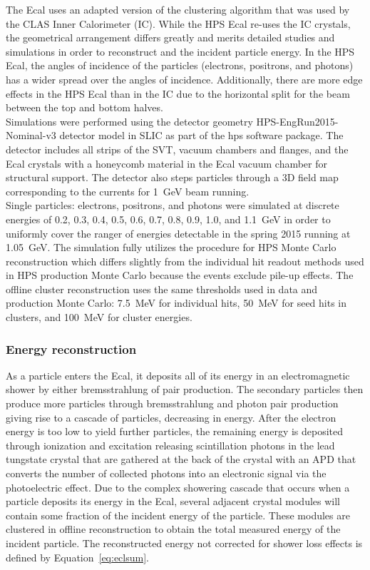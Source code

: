 The Ecal uses an adapted version of the clustering algorithm that was used by the CLAS Inner Calorimeter (IC). While the HPS Ecal re-uses the IC crystals, the geometrical arrangement differs greatly and merits detailed studies and simulations in order to reconstruct and the incident particle energy. In the HPS Ecal, the angles of incidence of the particles (electrons, positrons, and photons) has a wider spread over the angles of incidence. Additionally, there are more edge effects in the HPS Ecal than in the IC due to the horizontal split for the beam between the top and bottom halves. \\
\indent Simulations were performed using the detector geometry HPS-EngRun2015-Nominal-v3 detector model in SLIC as part of the hps software package. The detector includes all strips of the SVT, vacuum chambers and flanges, and the Ecal crystals with a honeycomb material in the Ecal vacuum chamber for structural support. The detector also steps particles through a 3D field map corresponding to the currents for 1~GeV beam running. \\
\indent Single particles: electrons, positrons, and photons were simulated at discrete energies of 0.2, 0.3, 0.4, 0.5, 0.6, 0.7, 0.8,  0.9, 1.0, and 1.1~GeV in order to uniformly cover the ranger of energies detectable in the spring 2015 running at 1.05~GeV. The simulation fully utilizes the procedure for HPS Monte Carlo reconstruction which differs slightly from the individual hit readout methods used in HPS production Monte Carlo because the events exclude pile-up effects. The offline cluster reconstruction uses the same thresholds used in data and production Monte Carlo: 7.5~MeV for individual hits, 50~MeV for seed hits in clusters, and 100~MeV for cluster energies.\\

\subsubsection{Energy reconstruction}
\indent As a particle enters the Ecal, it deposits all of its energy in an electromagnetic shower by either bremsstrahlung of pair production. The secondary particles then produce more particles through bremsstrahlung and photon pair production giving rise to a cascade of particles, decreasing in energy. After the electron energy is too low to yield further particles, the remaining energy is deposited through ionization and excitation releasing scintillation photons in the lead tungstate crystal that are gathered at the back of the crystal with an APD that converts the number of collected photons into an electronic signal via the photoelectric effect. Due to the complex showering cascade that occurs when a particle deposits its energy in the Ecal, several adjacent crystal modules will contain some fraction of the incident energy of the particle. These modules are clustered in offline reconstruction to obtain the total measured energy of the incident particle. The reconstructed energy not corrected for shower loss effects is defined by Equation~\eqref{eq:eclsum}.

